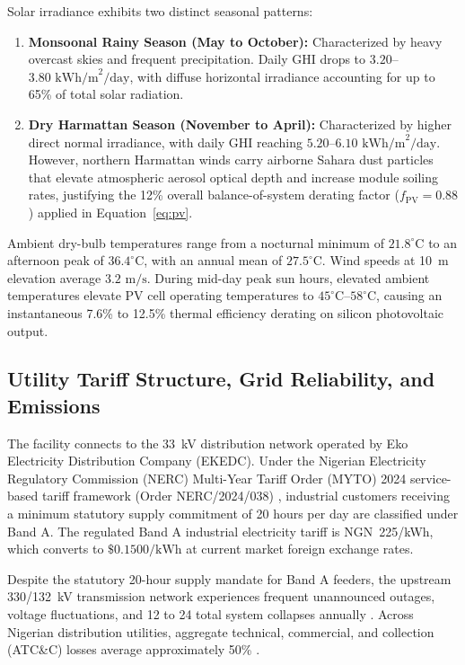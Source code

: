 \documentclass[11pt,a4paper]{article}
\begin{document}
Solar irradiance exhibits two distinct seasonal patterns:
\begin{enumerate}
    \item \textbf{Monsoonal Rainy Season (May to October):} Characterized by heavy overcast skies and frequent precipitation. Daily GHI drops to $3.20$--$3.80\text{ kWh/m}^2/\text{day}$, with diffuse horizontal irradiance accounting for up to 65\% of total solar radiation.
    \item \textbf{Dry Harmattan Season (November to April):} Characterized by higher direct normal irradiance, with daily GHI reaching $5.20$--$6.10\text{ kWh/m}^2/\text{day}$. However, northern Harmattan winds carry airborne Sahara dust particles that elevate atmospheric aerosol optical depth and increase module soiling rates, justifying the 12\% overall balance-of-system derating factor ($f_{\text{PV}} = 0.88$) applied in Equation~\eqref{eq:pv}.
\end{enumerate}

Ambient dry-bulb temperatures range from a nocturnal minimum of $21.8^\circ\text{C}$ to an afternoon peak of $36.4^\circ\text{C}$, with an annual mean of $27.5^\circ\text{C}$. Wind speeds at 10~m elevation average $3.2\text{ m/s}$. During mid-day peak sun hours, elevated ambient temperatures elevate PV cell operating temperatures to $45^\circ\text{C}$--$58^\circ\text{C}$, causing an instantaneous 7.6\% to 12.5\% thermal efficiency derating on silicon photovoltaic output.

\subsection{Utility Tariff Structure, Grid Reliability, and Emissions}
\label{sec:grid_tariffs}
The facility connects to the 33~kV distribution network operated by Eko Electricity Distribution Company (EKEDC). Under the Nigerian Electricity Regulatory Commission (NERC) Multi-Year Tariff Order (MYTO) 2024 service-based tariff framework (Order NERC/2024/038) \cite{NERC2024}, industrial customers receiving a minimum statutory supply commitment of 20 hours per day are classified under Band A. The regulated Band A industrial electricity tariff is NGN~225/kWh, which converts to $\$0.1500/\text{kWh}$ at current market foreign exchange rates.

Despite the statutory 20-hour supply mandate for Band A feeders, the upstream 330/132~kV transmission network experiences frequent unannounced outages, voltage fluctuations, and 12 to 24 total system collapses annually \cite{Arowolo2022}. Across Nigerian distribution utilities, aggregate technical, commercial, and collection (ATC\&C) losses average approximately 50\% \cite{WorldBank2020}. 
\end{document}

